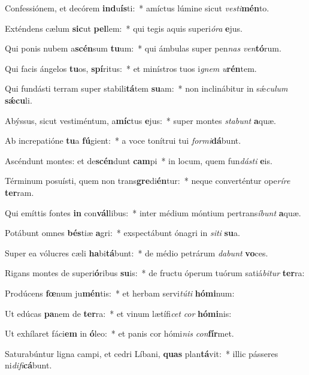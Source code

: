 \item Confessiónem, et decórem \textbf{ind}u\textbf{ís}ti:~* amíctus lúmine sicut \textit{ves}\textit{ti}\textbf{mén}to.
\item Exténdens cælum \textbf{sic}ut \textbf{pel}lem:~* qui tegis aquis superi\textit{ó}\textit{ra} \textbf{e}jus.
\item Qui ponis nubem a\textbf{scén}sum \textbf{tu}um:~* qui ámbulas super pen\textit{nas} \textit{ven}\textbf{tó}rum.
\item Qui facis ángelos \textbf{tu}os, \textbf{spí}ritus:~* et minístros tuos i\textit{gnem} \textit{u}\textbf{rén}tem.
\item Qui fundásti terram super stabili\textbf{tá}tem \textbf{su}am:~* non inclinábitur in sǽ\textit{cu}\textit{lum} \textbf{sǽ}\textbf{cu}li.
\item Abýssus, sicut vestiméntum, a\textbf{míc}tus \textbf{e}jus:~* super montes \textit{sta}\textit{bunt} \textbf{a}quæ.
\item Ab increpatióne \textbf{tu}a \textbf{fú}gient:~* a voce tonítrui tui \textit{for}\textit{mi}\textbf{dá}bunt.
\item Ascéndunt montes: et de\textbf{scén}dunt \textbf{cam}pi~* in locum, quem fun\textit{dás}\textit{ti} \textbf{e}is.
\item Términum posuísti, quem non trans\textbf{gre}di\textbf{én}tur:~* neque converténtur ope\textit{rí}\textit{re} \textbf{ter}ram.
\item Qui emíttis fontes \textbf{in} con\textbf{vál}libus:~* inter médium móntium pertrans\textit{í}\textit{bunt} \textbf{a}quæ.
\item Potábunt omnes \textbf{bés}tiæ \textbf{a}gri:~* exspectábunt ónagri in \textit{si}\textit{ti} \textbf{su}a.
\item Super ea vólucres cæli \textbf{ha}bi\textbf{tá}bunt:~* de médio petrárum \textit{da}\textit{bunt} \textbf{vo}ces.
\item Rigans montes de superi\textbf{ó}ribus \textbf{su}is:~* de fructu óperum tuórum satiá\textit{bi}\textit{tur} \textbf{ter}ra:
\item Prodúcens \textbf{fœ}num ju\textbf{mén}tis:~* et herbam servi\textit{tú}\textit{ti} \textbf{hó}\textbf{mi}num:
\item Ut edúcas \textbf{pa}nem de \textbf{ter}ra:~* et vinum lætífi\textit{cet} \textit{cor} \textbf{hó}\textbf{mi}nis:
\item Ut exhílaret fáci\textbf{em} in \textbf{ó}leo:~* et panis cor hómi\textit{nis} \textit{con}\textbf{fír}met.
\item Saturabúntur ligna campi, et cedri Líbani, \textbf{quas} plan\textbf{tá}vit:~* illic pásseres ni\textit{di}\textit{fi}\textbf{cá}bunt.
